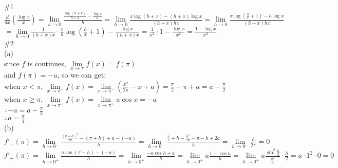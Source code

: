 \documentclass{article}
\begin{document}
\vspace{3.5mm}

\textcolor[rgb]{0.00,0.00,0.50}{\#1}\\

$\displaystyle\frac{d}{dx}\left(\frac{\log x}{x}\right)=\lim \limits_{h \to 0}\frac{\frac{\log(h+x)}{h+x}-\frac{\log x}{x}}{h}=\lim \limits_{h \to 0}\frac{x\log(h+x)-(h+x)\log x}{(h+x)hx}=\lim \limits_{h \to 0}\frac{x\log(\frac{h}{x}+1)-h\log x}{(h+x)hx}$\\

\qquad\qquad\qquad$\displaystyle=\lim \limits_{h \to 0}\frac{1}{(h+x)x}\cdot\frac{x}{h}\log\left(\frac{h}{x}+1\right)-\frac{\log x}{(h+x)x}=\frac{1}{x^2}\cdot1-\frac{\log x}{x^2}=\frac{1-\log x}{x^2}$\\

\textcolor[rgb]{0.00,0.00,0.50}{\#2}\\

(a)\\

since $f$ is continues, $\lim \limits_{x \to \pi}f(x)=f(\pi)$\\

and $f(\pi)=-a$, so we can get:\\

when $x<\pi$, $\displaystyle\lim \limits_{x \to \pi^-}f(x)=\lim \limits_{x \to \pi^-}\left(\frac{x^2}{2\pi}-x+a\right)=\frac{\pi}{2}-\pi+a=a-\frac{\pi}{2}$\\

when $x\geq\pi$, $\displaystyle\lim \limits_{x \to \pi^+}f(x)=\lim \limits_{x \to \pi^+}a\cos x=-a$\\

$\therefore$\qquad$-a=a-\displaystyle\frac{\pi}{2}$\\

$\therefore$\qquad$a=\displaystyle\frac{\pi}{4}$\\

(b)\\

$f'_-(\pi)=\lim \limits_{h \to 0^-}\displaystyle\frac{\frac{(\pi+h)^2}{2\pi}-(\pi+h)+a-(-a)}{h}=\lim \limits_{h \to 0^-}\frac{\frac{\pi}{2}+h+\frac{h^2}{2\pi}-\pi-h+2a}{h}=\lim \limits_{h \to 0^-}\frac{h}{2\pi}=0$\\

$f'_+(\pi)=\lim \limits_{h \to 0^+}\displaystyle\frac{a\cos(\pi+h)-(-a)}{h}=\lim \limits_{h \to 0^+}\frac{-a\cos h+a}{h}=\lim \limits_{h \to 0^+}a\frac{1-\cos h}{h}=\lim \limits_{h \to 0^+}a\frac{\sin^2\frac{h}{2}}{\frac{h^2}{4}}\cdot\frac{h}{2}=a\cdot1^2\cdot0=0$\\
\end{document}
